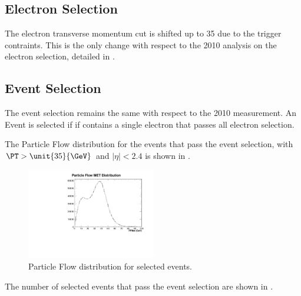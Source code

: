 \subsection{Electron Selection}

The electron transverse momentum cut is shifted up to \unit{35}{\GeV} due to
the trigger contraints. This is the only change with respect to the 2010
analysis on the electron selection, detailed in
.

\subsection{Event Selection}
The event selection remains the same with respect to the 2010 measurement.
An Event is selected if if contains a single electron that passes all electron
selection.

The Particle Flow \ETm distribution for the events that pass the event
selection, with $\PT > \unit{35}{\GeV}$ and $|\eta| < 2.4$ is shown in
.

\begin{figure}[htbp]
  \centering
  \includegraphics[width=0.5\textwidth]{pfmet_new}
  \caption{Particle Flow \ETm distribution for selected events.}
  \label{asym840:pfmet}
\end{figure}

The number of selected events that pass the event selection are shown in
.

